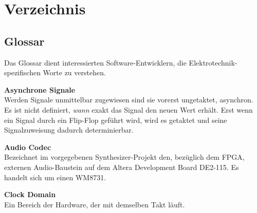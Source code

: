 
\chapter{Verzeichnis}\label{chap.verzeichnis}

\renewcommand{\bibsection}{\section{\refname}}  %

\makeatletter
\renewcommand*\bib@heading{ \section{\refname}}
\makeatother




 


\section{Glossar}\label{sect.verzeichnis_glossar}

Das Glossar dient interessierten Software-Entwicklern, die Elektrotechnik-spezifischen Worte zu verstehen.

\textbf{Asynchrone Signale}\\
Werden Signale unmittelbar zugewiesen sind sie vorerst ungetaktet, asynchron. Es ist nicht definiert, \textit{wann} exakt das Signal den neuen Wert erhält. Erst wenn ein Signal durch ein Flip-Flop geführt wird, wird es getaktet und seine Signalzuweisung dadurch determinierbar.

\textbf{Audio Codec}\\
Bezeichnet im vorgegebenen Synthesizer-Projekt den, bezüglich dem FPGA, externen Audio-Baustein auf dem Altera Development Board DE2-115. Es handelt sich um einen WM8731.

\textbf{Clock Domain}\\
Ein Bereich der Hardware, der mit demselben Takt läuft.

